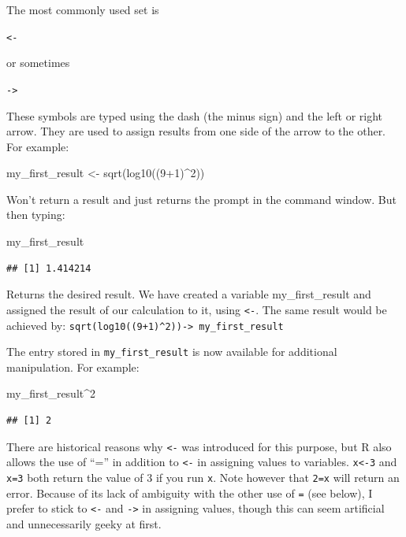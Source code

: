 \documentclass[
]{book}
\newenvironment{Shaded}{\begin{snugshade}}{\end{snugshade}}
\newcommand{\DecValTok}[1]{\textcolor[rgb]{0.00,0.00,0.81}{#1}}
\newcommand{\FunctionTok}[1]{\textcolor[rgb]{0.00,0.00,0.00}{#1}}
\newcommand{\NormalTok}[1]{#1}
\newcommand{\OtherTok}[1]{\textcolor[rgb]{0.56,0.35,0.01}{#1}}
\newcommand{\SpecialCharTok}[1]{\textcolor[rgb]{0.00,0.00,0.00}{#1}}
\begin{document}
The most commonly used set is

\texttt{\textless{}-}

or sometimes

\texttt{-\textgreater{}}

These symbols are typed using the dash (the minus sign) and the left or right arrow. They are used to assign results from one side of the arrow to the other. For example:

\begin{Shaded}
\begin{Highlighting}[]
\NormalTok{my\_first\_result }\OtherTok{\textless{}{-}} \FunctionTok{sqrt}\NormalTok{(}\FunctionTok{log10}\NormalTok{((}\DecValTok{9}\SpecialCharTok{+}\DecValTok{1}\NormalTok{)}\SpecialCharTok{\^{}}\DecValTok{2}\NormalTok{))}
\end{Highlighting}
\end{Shaded}

Won't return a result and just returns the prompt in the command window. But then typing:

\begin{Shaded}
\begin{Highlighting}[]
\NormalTok{my\_first\_result}
\end{Highlighting}
\end{Shaded}

\begin{verbatim}
## [1] 1.414214
\end{verbatim}

Returns the desired result. We have created a variable my\_first\_result and assigned the result of our calculation to it, using \texttt{\textless{}-}. The same result would be achieved by: \texttt{sqrt(log10((9+1)\^{}2))-\textgreater{}\ my\_first\_result}

The entry stored in \texttt{my\_first\_result} is now available for additional manipulation. For example:

\begin{Shaded}
\begin{Highlighting}[]
\NormalTok{my\_first\_result}\SpecialCharTok{\^{}}\DecValTok{2}
\end{Highlighting}
\end{Shaded}

\begin{verbatim}
## [1] 2
\end{verbatim}

There are historical reasons why \texttt{\textless{}-} was introduced for this purpose, but R also allows the use of ``='' in addition to \texttt{\textless{}-} in assigning values to variables. \texttt{x\textless{}-3} and \texttt{x=3} both return the value of 3 if you run \texttt{x}. Note however that \texttt{2=x} will return an error. Because of its lack of ambiguity with the other use of \texttt{=} (see below), I prefer to stick to \texttt{\textless{}-} and \texttt{-\textgreater{}} in assigning values, though this can seem artificial and unnecessarily geeky at first.
\end{document}
